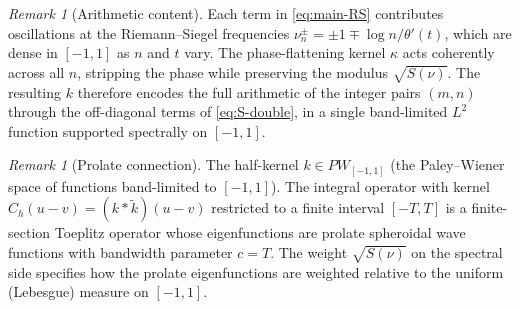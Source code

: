 \documentclass[11pt,reqno]{amsart}
\theoremstyle{definition}
\theoremstyle{remark}
\newtheorem{remark}[theorem]{Remark}
\begin{document}
\begin{remark}[Arithmetic content]
Each term in \eqref{eq:main-RS} contributes oscillations at the
Riemann--Siegel frequencies \(\nu_n^\pm = \pm 1 \mp \log n/\theta'(t)\),
which are dense in \([-1,1]\) as \(n\) and \(t\) vary. The
phase-flattening kernel \(\kappa\) acts coherently across all \(n\),
stripping the phase while preserving the modulus \(\sqrt{S(\nu)}\). The
resulting \(k\) therefore encodes the full arithmetic of the integer
pairs \((m,n)\) through the off-diagonal terms of \eqref{eq:S-double},
in a single band-limited \(L^2\) function supported spectrally on
\([-1,1]\).
\end{remark}

\begin{remark}[Prolate connection]
The half-kernel \(k\in PW_{[-1,1]}\) (the Paley--Wiener space of
functions band-limited to \([-1,1]\)). The integral operator with kernel
\(C_h(u-v) = (k*\tilde{k})(u-v)\) restricted to a finite interval
\([-T,T]\) is a finite-section Toeplitz operator whose eigenfunctions
are prolate spheroidal wave functions with bandwidth parameter \(c=T\).
The weight \(\sqrt{S(\nu)}\) on the spectral side specifies how the
prolate eigenfunctions are weighted relative to the uniform (Lebesgue)
measure on \([-1,1]\).
\end{remark}
\end{document}
